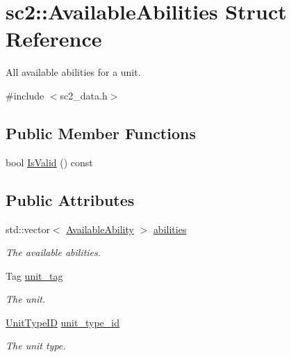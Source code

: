 \hypertarget{structsc2_1_1_available_abilities}{}\section{sc2\+:\+:Available\+Abilities Struct Reference}
\label{structsc2_1_1_available_abilities}


All available abilities for a unit.  




{\ttfamily \#include $<$sc2\+\_\+data.\+h$>$}

\subsection*{Public Member Functions}
\begin{DoxyCompactItemize}
\item 
bool \hyperlink{structsc2_1_1_available_abilities_a9ee95eab5fb81086c452a8790c13c368}{Is\+Valid} () const
\end{DoxyCompactItemize}
\subsection*{Public Attributes}
\begin{DoxyCompactItemize}
\item 
\mbox{\label{structsc2_1_1_available_abilities_af894555e7aa8ca9f4a7eb601a898287c}} 
std\+::vector$<$ \hyperlink{structsc2_1_1_available_ability}{Available\+Ability} $>$ \hyperlink{structsc2_1_1_available_abilities_af894555e7aa8ca9f4a7eb601a898287c}{abilities}
\begin{DoxyCompactList}\small\item\em The available abilities. \end{DoxyCompactList}\item 
\mbox{\label{structsc2_1_1_available_abilities_aa89084e4b2b9948815f833f3ed40a4fb}} 
Tag \hyperlink{structsc2_1_1_available_abilities_aa89084e4b2b9948815f833f3ed40a4fb}{unit\+\_\+tag}
\begin{DoxyCompactList}\small\item\em The unit. \end{DoxyCompactList}\item 
\mbox{\label{structsc2_1_1_available_abilities_a731332d717ebab756e47f2fd6d706cb0}} 
\hyperlink{classsc2_1_1_s_c2_type}{Unit\+Type\+ID} \hyperlink{structsc2_1_1_available_abilities_a731332d717ebab756e47f2fd6d706cb0}{unit\+\_\+type\+\_\+id}
\begin{DoxyCompactList}\small\item\em The unit type. \end{DoxyCompactList}\end{DoxyCompactItemize}


